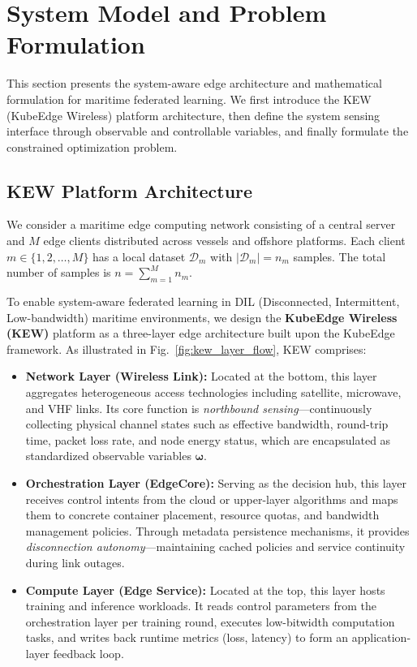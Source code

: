 \documentclass[journal]{IEEEtran}
\begin{document}
\section{System Model and Problem Formulation}
\label{sec:system}

This section presents the system-aware edge architecture and mathematical formulation for maritime federated learning. We first introduce the KEW (KubeEdge Wireless) platform architecture, then define the system sensing interface through observable and controllable variables, and finally formulate the constrained optimization problem.

\subsection{KEW Platform Architecture}
We consider a maritime edge computing network consisting of a central server and $M$ edge clients distributed across vessels and offshore platforms. Each client $m \in \{1, 2, \ldots, M\}$ has a local dataset $\mathcal{D}_m$ with $|\mathcal{D}_m| = n_m$ samples. The total number of samples is $n = \sum_{m=1}^{M} n_m$.

To enable system-aware federated learning in DIL (Disconnected, Intermittent, Low-bandwidth) maritime environments, we design the \textbf{KubeEdge Wireless (KEW)} platform as a three-layer edge architecture built upon the KubeEdge framework. As illustrated in Fig.~\ref{fig:kew_layer_flow}, KEW comprises:

\begin{itemize}
    \item \textbf{Network Layer (Wireless Link):} Located at the bottom, this layer aggregates heterogeneous access technologies including satellite, microwave, and VHF links. Its core function is \textit{northbound sensing}---continuously collecting physical channel states such as effective bandwidth, round-trip time, packet loss rate, and node energy status, which are encapsulated as standardized observable variables $\boldsymbol{\omega}$.
    
    \item \textbf{Orchestration Layer (EdgeCore):} Serving as the decision hub, this layer receives control intents from the cloud or upper-layer algorithms and maps them to concrete container placement, resource quotas, and bandwidth management policies. Through metadata persistence mechanisms, it provides \textit{disconnection autonomy}---maintaining cached policies and service continuity during link outages.
    
    \item \textbf{Compute Layer (Edge Service):} Located at the top, this layer hosts training and inference workloads. It reads control parameters from the orchestration layer per training round, executes low-bitwidth computation tasks, and writes back runtime metrics (loss, latency) to form an application-layer feedback loop.
\end{itemize}
\end{document}
